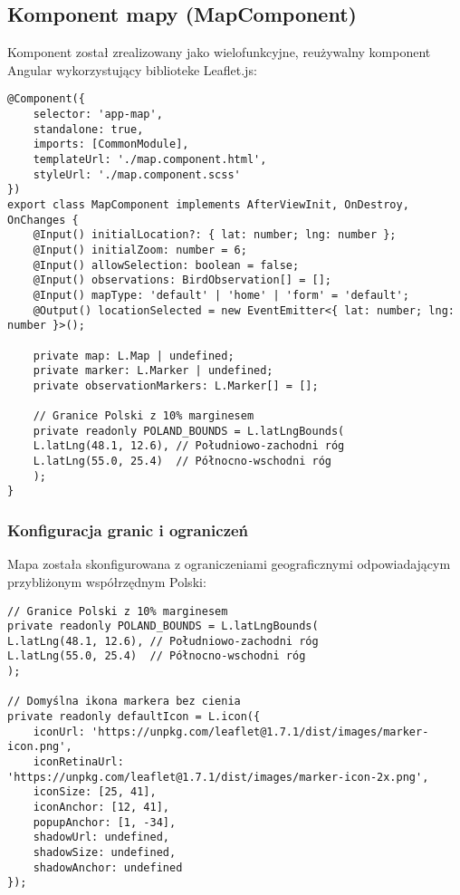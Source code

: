 \subsection{Komponent mapy (MapComponent)}
Komponent został zrealizowany jako wielofunkcyjne, reużywalny komponent Angular wykorzystujący biblioteke Leaflet.js:

\begin{lstlisting}[style=tsstyle, caption={Komponent mapy w Angular}]
@Component({
	selector: 'app-map',
	standalone: true,
	imports: [CommonModule],
	templateUrl: './map.component.html',
	styleUrl: './map.component.scss'
})
export class MapComponent implements AfterViewInit, OnDestroy, OnChanges {
	@Input() initialLocation?: { lat: number; lng: number };
	@Input() initialZoom: number = 6;
	@Input() allowSelection: boolean = false;
	@Input() observations: BirdObservation[] = [];
	@Input() mapType: 'default' | 'home' | 'form' = 'default';
	@Output() locationSelected = new EventEmitter<{ lat: number; lng: number }>();
	
	private map: L.Map | undefined;
	private marker: L.Marker | undefined;
	private observationMarkers: L.Marker[] = [];
	
	// Granice Polski z 10% marginesem
	private readonly POLAND_BOUNDS = L.latLngBounds(
	L.latLng(48.1, 12.6), // Południowo-zachodni róg
	L.latLng(55.0, 25.4)  // Północno-wschodni róg
	);
}
\end{lstlisting}

\subsubsection{Konfiguracja granic i ograniczeń}
Mapa została skonfigurowana z ograniczeniami geograficznymi odpowiadającym przybliżonym współrzędnym Polski:

\begin{lstlisting}[style=tsstyle, caption={Parametry mapy}]
// Granice Polski z 10% marginesem
private readonly POLAND_BOUNDS = L.latLngBounds(
L.latLng(48.1, 12.6), // Południowo-zachodni róg
L.latLng(55.0, 25.4)  // Północno-wschodni róg
);

// Domyślna ikona markera bez cienia
private readonly defaultIcon = L.icon({
	iconUrl: 'https://unpkg.com/leaflet@1.7.1/dist/images/marker-icon.png',
	iconRetinaUrl: 'https://unpkg.com/leaflet@1.7.1/dist/images/marker-icon-2x.png',
	iconSize: [25, 41],
	iconAnchor: [12, 41],
	popupAnchor: [1, -34],
	shadowUrl: undefined,
	shadowSize: undefined,
	shadowAnchor: undefined
});
\end{lstlisting}

